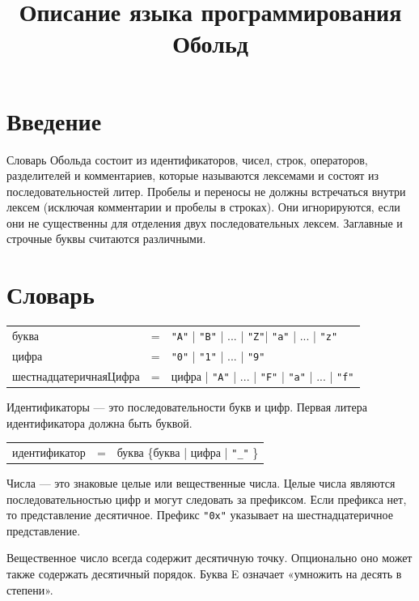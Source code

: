 \documentclass[a4paper,12pt]{article}
\title{\textbf{Описание языка программирования Обольд}}
\date{}
\newcommand{\lit}[1]{\texttt{"#1"}}
\begin{document}
    \maketitle
    \vspace{-2cm}


    \section{Введение}
    Словарь Обольда состоит из идентификаторов, чисел, строк, операторов, разделителей и комментариев, которые называются лексемами и состоят из последовательностей литер. Пробелы и переносы не должны встречаться внутри лексем (исключая комментарии и пробелы в строках). Они игнорируются, если они не существенны для отделения двух последовательных лексем. Заглавные и строчные буквы считаются различными.


    \section{Словарь}


    \begin{tabular}{l c l}
        буква & = & \lit{A} | \lit{B} | ... | \lit{Z}| \lit{a} | ... | \lit{z} \\
        цифра & = & \lit{0} | \lit{1} | ... | \lit{9} \\
        шестнадцатеричнаяЦифра & = & цифра | \lit{A} | ... | \lit{F} | \lit{a} | ... | \lit{f}
    \end{tabular}
    \vspace{0.5cm}

    Идентификаторы — это последовательности букв и цифр. Первая литера идентификатора должна быть буквой.

    \vspace{0.5cm}
    \begin{tabular}{l c l}
        идентификатор & = & буква \{буква | цифра | \lit{\_} \}
    \end{tabular}
    \vspace{0.5cm}

    Числа — это знаковые целые или вещественные числа. Целые числа являются последовательностью цифр и могут следовать за префиксом. Если префикса нет, то представление десятичное. Префикс \lit{0x} указывает на шестнадцатеричное представление.

    Вещественное число всегда содержит десятичную точку. Опционально оно может также содержать десятичный порядок. Буква E означает «умножить на десять в степени».
\end{document}

